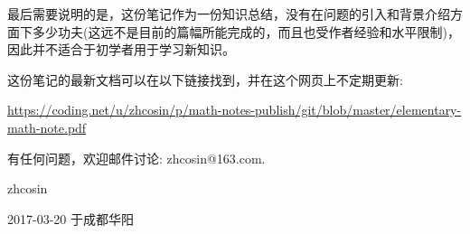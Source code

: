 最后需要说明的是，这份笔记作为一份知识总结，没有在问题的引入和背景介绍方面下多少功夫(这远不是目前的篇幅所能完成的，而且也受作者经验和水平限制)，因此并不适合于初学者用于学习新知识。

这份笔记的最新文档可以在以下链接找到，并在这个网页上不定期更新:

\hyperref[pdf-download-link]{https://coding.net/u/zhcosin/p/math-notes-publish/git/blob/master/elementary-math-note.pdf}

有任何问题，欢迎邮件讨论: zhcosin@163.com.

\vspace{1.5cm}

\hfill zhcosin \hspace{5em}

\hfill 2017-03-20 于成都华阳 \hspace{1.5em}


